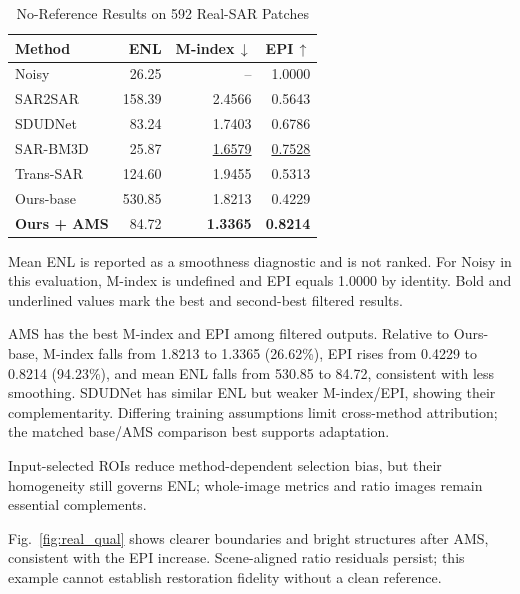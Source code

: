 \documentclass[journal]{IEEEtran}
\begin{document}
\begin{table}[!htbp]
\caption{No-Reference Results on 592 Real-SAR Patches}
\label{tab:real}
\centering
\footnotesize
\setlength{\tabcolsep}{3.0pt}
\renewcommand{\arraystretch}{1.08}
\begin{tabular*}{\columnwidth}{@{\extracolsep{\fill}}lrrr@{}}
\toprule
\textbf{Method} & \textbf{ENL} & \textbf{M-index}\,$\downarrow$ & \textbf{EPI}\,$\uparrow$ \\
\midrule
Noisy       & 26.25  & --                 & 1.0000 \\
SAR2SAR     & 158.39 & 2.4566             & 0.5643 \\
SDUDNet     & 83.24  & 1.7403             & 0.6786 \\
SAR-BM3D    & 25.87  & \underline{1.6579} & \underline{0.7528} \\
Trans-SAR   & 124.60 & 1.9455             & 0.5313 \\
Ours-base   & 530.85 & 1.8213             & 0.4229 \\
\textbf{Ours + AMS} & 84.72 & \textbf{1.3365} & \textbf{0.8214} \\
\bottomrule
\end{tabular*}
\vspace{1pt}
\parbox{\columnwidth}{\footnotesize\raggedright Mean ENL is reported as a smoothness diagnostic and is not ranked. For Noisy in this evaluation, M-index is undefined and EPI equals 1.0000 by identity. Bold and underlined values mark the best and second-best filtered results.}
\end{table}

AMS has the best M-index and EPI among filtered outputs. Relative to Ours-base, M-index falls from 1.8213 to 1.3365 (26.62\%), EPI rises from 0.4229 to 0.8214 (94.23\%), and mean ENL falls from 530.85 to 84.72, consistent with less smoothing. SDUDNet has similar ENL but weaker M-index/EPI, showing their complementarity. Differing training assumptions limit cross-method attribution; the matched base/AMS comparison best supports adaptation.

Input-selected ROIs reduce method-dependent selection bias, but their homogeneity still governs ENL; whole-image metrics and ratio images remain essential complements.

Fig.~\ref{fig:real_qual} shows clearer boundaries and bright structures after AMS, consistent with the EPI increase. Scene-aligned ratio residuals persist; this example cannot establish restoration fidelity without a clean reference.
\end{document}
